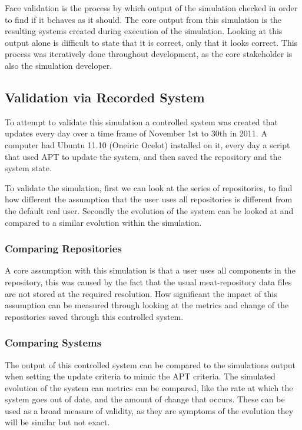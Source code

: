 Face validation is the process by which output of the simulation checked in order to find if it behaves as it should.
The core output from this simulation is the resulting systems created during execution of the simulation.
Looking at this output alone is difficult to state that it is correct, only that it looks correct.
This process was iteratively done throughout development, as the core stakeholder is also the simulation developer.

\subsection{Validation via Recorded System}
To attempt to validate this simulation a controlled system was created that updates every day over a time frame of November 1st to 30th in 2011.
A computer had Ubuntu 11.10 (Oneiric Ocelot) installed on it, every day a script that used APT to update the system, and then saved the repository and the system state.

To validate the simulation, first we can look at the series of repositories, to find how different the assumption that the user uses all repositories is different from the default real user.
Secondly the evolution of the system can be looked at and compared to a similar evolution within the simulation.

\subsubsection{Comparing Repositories}
A core assumption with this simulation is that a user uses all components in the repository, 
this was caused by the fact that the usual meat-repository data files are not stored at the required resolution.
How significant the impact of this assumption can be measured through looking at the metrics and change of the repositories saved through this controlled system.


\subsubsection{Comparing Systems}
The output of this controlled system can be compared to the simulations output when setting the update criteria to mimic the APT criteria.
The simulated evolution of the system can metrics can be compared, like the rate at which the system goes out of date, and the amount of change that occurs.
These can be used as a broad measure of validity, as they are symptoms of the evolution they will be similar but not exact.

